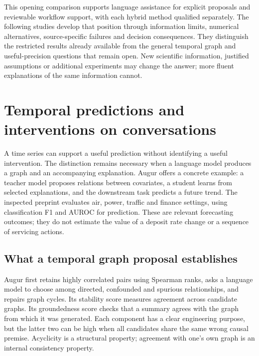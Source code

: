 This opening comparison supports language assistance for explicit proposals
and reviewable workflow support, with each hybrid method qualified separately.
The following studies develop that position through information limits,
numerical alternatives, source-specific failures and decision consequences.
They distinguish the restricted results already available from the general
temporal graph and useful-precision questions that remain open. New scientific
information, justified assumptions or additional experiments may change the
answer; more fluent explanations of the same information cannot.


\hypertarget{temporal-predictions-and-interventions-on-conversations}{%
\section{Temporal predictions and interventions on
conversations}\label{temporal-predictions-and-interventions-on-conversations}}

\label{exec13:census-temporal}

A time series can support a useful prediction without identifying a
useful intervention. The distinction remains necessary when a language
model produces a graph and an accompanying explanation. Augur offers a
concrete example: a teacher model proposes relations between covariates,
a student learns from selected explanations, and the downstream task
predicts a future trend. The inspected preprint evaluates air, power,
traffic and finance settings, using classification F1 and AUROC for
prediction. These are relevant forecasting outcomes; they do not
estimate the value of a deposit rate change or a sequence of servicing
actions. \cite{exec13_census_augur_arxiv}

\hypertarget{what-a-temporal-graph-proposal-establishes}{%
\subsection{What a temporal graph proposal
establishes}\label{what-a-temporal-graph-proposal-establishes}}

Augur first retains highly correlated pairs using Spearman ranks, asks a
language model to choose among directed, confounded and spurious
relationships, and repairs graph cycles. Its stability score measures
agreement across candidate graphs. Its groundedness score checks that a
summary agrees with the graph from which it was generated. Each
component has a clear engineering purpose, but the latter two can be
high when all candidates share the same wrong causal premise. Acyclicity
is a structural property; agreement with one's own graph is an internal
consistency property. \cite{exec13_census_augur_arxiv}

